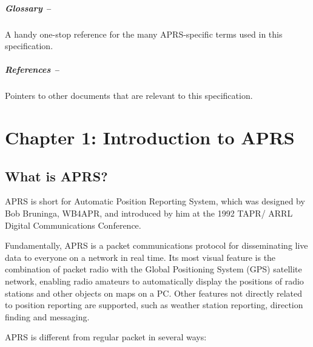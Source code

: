 \documentclass{scrreprt}[letter]
\begin{document}

\paragraph{Glossary --}A handy one-stop reference for the many APRS-specific terms
used in this specification.

\paragraph{References --}Pointers to other documents that are relevant to this
specification.


\chapter {Chapter 1: Introduction to APRS}


\section{What is APRS?}

APRS is short for Automatic Position Reporting System, which was designed
by Bob Bruninga, WB4APR, and introduced by him at the 1992 TAPR/
ARRL Digital Communications Conference.

Fundamentally, APRS is a packet communications protocol for
disseminating live data to everyone on a network in real time. Its most visual
feature is the combination of packet radio with the Global Positioning
System (GPS) satellite network, enabling radio amateurs to automatically
display the positions of radio stations and other objects on maps on a PC.
Other features not directly related to position reporting are supported, such as
weather station reporting, direction finding and messaging.

APRS is different from regular packet in several ways:
\end{document}
